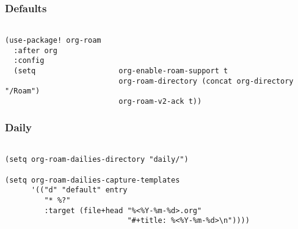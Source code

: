 \documentclass[c]{article}
\theoremstyle{plain}%
\theoremstyle{definition}
\theoremstyle{remark}
\begin{document}
\subsubsection{Defaults}
\label{sec:org0b81bb0}
\begin{verbatim}

(use-package! org-roam
  :after org
  :config
  (setq                   org-enable-roam-support t
                          org-roam-directory (concat org-directory "/Roam")
                          org-roam-v2-ack t))

\end{verbatim}
\subsubsection{Daily}
\label{sec:org0f8ed72}
\begin{verbatim}

(setq org-roam-dailies-directory "daily/")

(setq org-roam-dailies-capture-templates
      '(("d" "default" entry
         "* %?"
         :target (file+head "%<%Y-%m-%d>.org"
                            "#+title: %<%Y-%m-%d>\n"))))
\end{verbatim}
\end{document}
